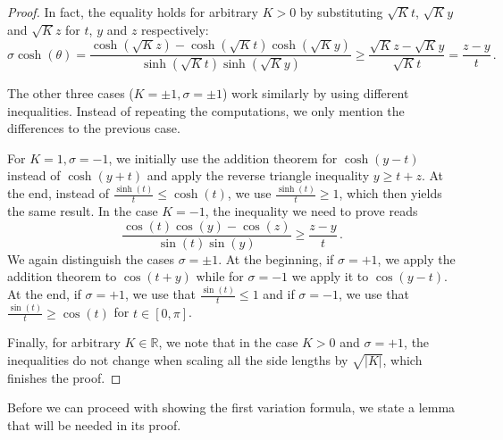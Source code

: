 \documentclass[11pt,reqno]{amsart}
\theoremstyle{definition}
\theoremstyle{definition}
\theoremstyle{plain}
\theoremstyle{remark}
\newcommand{\R}{\mathbb R}
\begin{document}
\begin{proof}
    In fact, the equality holds for arbitrary $K>0$ by substituting $\sqrt{K}t$, $\sqrt{K}y$ and $\sqrt{K}z$ for $t$, $y$ and $z$ respectively:
    \[ \sigma \cosh(\theta) =\frac{\cosh(\sqrt{K}z) - \cosh(\sqrt{K} t)\cosh(\sqrt{K} y)}{\sinh(\sqrt{K} t) \sinh(\sqrt{K} y)} \geq \frac{\sqrt{K} z - \sqrt{K} y}{\sqrt{K} t} = \frac{z-y}{t} \, .\]

    The other three cases ($K=\pm1, \sigma=\pm1$) work similarly by using different inequalities.
    Instead of repeating the computations, we only mention the differences to the previous case. 
    
    For $K=1,\sigma=-1$, we initially use the addition theorem for $\cosh(y-t)$ instead of $\cosh(y+t)$ and apply the reverse triangle inequality $y\geq t+z$. At the end, instead of $\frac{\sinh(t)}{t}\leq\cosh(t)$, we use $\frac{\sinh(t)}{t}\geq 1$, which then yields the same result. 
    In the case $K=-1$, the inequality we need to prove reads 
    \[\frac{\cos(t)\cos(y) - \cos(z)}{\sin(t) \sin(y)} \geq \frac{z-y}{t} \, .\]
    We again distinguish the cases $\sigma=\pm1$. At the beginning, if $\sigma=+1$, we apply the addition theorem to $\cos(t+y)$ while for $\sigma=-1$ we apply it to $\cos(y-t)$. At the end, if $\sigma=+1$, we use that $\frac{\sin(t)}{t}\leq 1$ and if $\sigma=-1$, we use that $\frac{\sin(t)}{t}\geq \cos(t)$ for $t\in[0,\pi]$.  

    Finally, for arbitrary $K\in\R$, we note that in the case $K>0$ and $\sigma=+1$, the inequalities do not change when scaling all the side lengths by $\sqrt{|K|}$, which finishes the proof.
\end{proof}

Before we can proceed with showing the first variation formula, we state a lemma that will be needed in its proof.
\end{document}
